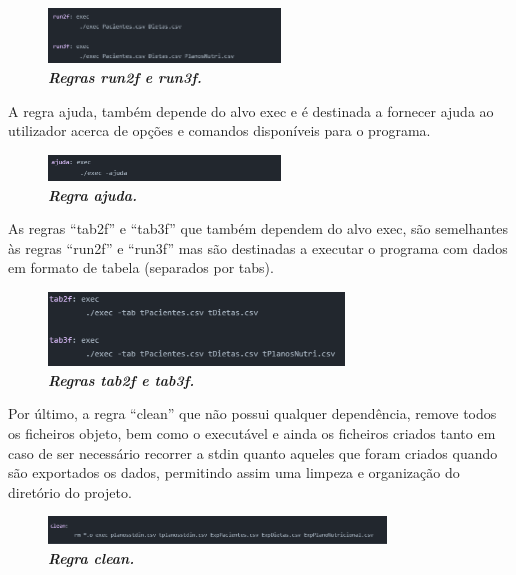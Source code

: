 \documentclass[a4wide]{report}
\begin{document}
{{{{\begin{figure}[hbt]
    \centering
    \includegraphics[width=0.55\textwidth]{figura10.png}
    \caption{\textbf{\textit{Regras run2f e run3f.}}\label{fig:imagem}}
\end{figure}

A regra ajuda, também depende do alvo exec e é destinada a fornecer ajuda ao utilizador acerca de opções e comandos disponíveis para o programa. 
\\

\begin{figure}[hbt]
    \centering
    \includegraphics[width=0.55\textwidth]{figura11.png}
    \caption{\textbf{\textit{Regra ajuda.}}\label{fig:imagem}}
\end{figure}

As regras “tab2f” e “tab3f” que também dependem do alvo exec, são semelhantes às regras “run2f” e “run3f” mas são destinadas a executar o programa com dados em formato de tabela (separados por tabs).
\\

\begin{figure}[hbt]
    \centering
    \includegraphics[width=0.70\textwidth]{figura12.png}
    \caption{\textbf{\textit{Regras tab2f e tab3f.}}\label{fig:imagem}}
\end{figure}

\newpage
Por último, a regra “clean” que não possui qualquer dependência, remove todos os ficheiros objeto, bem como o executável e ainda os ficheiros criados tanto em caso de ser necessário recorrer a stdin quanto aqueles que foram criados quando são exportados os dados, permitindo assim uma limpeza e organização do diretório do projeto.

\begin{figure}[hbt]
    \centering
    \includegraphics[width=0.80\textwidth]{figura14.png}
    \caption{\textbf{\textit{Regra clean.}}\label{fig:imagem}}
\end{figure}

}}}}
\end{document}
